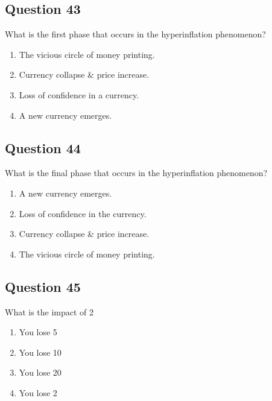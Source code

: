 \documentclass[12pt,a4paper]{article}
\begin{document}
\bigskip


\subsection*{Question 43}
What is the first phase that occurs in the hyperinflation phenomenon?

\begin{enumerate}[label=\Alph*., leftmargin=*]
\item The vicious circle of money printing.
\item Currency collapse & price increase.
\item Loss of confidence in a currency.
\item A new currency emerges.
\end{enumerate}

\bigskip


\subsection*{Question 44}
What is the final phase that occurs in the hyperinflation phenomenon?

\begin{enumerate}[label=\Alph*., leftmargin=*]
\item A new currency emerges.
\item Loss of confidence in the currency.
\item Currency collapse & price increase.
\item The vicious circle of money printing.
\end{enumerate}

\bigskip


\subsection*{Question 45}
What is the impact of 2%

\begin{enumerate}[label=\Alph*., leftmargin=*]
\item You lose 5%
\item You lose 10%
\item You lose 20%
\item You lose 2%
\end{enumerate}

\bigskip
\end{document}
